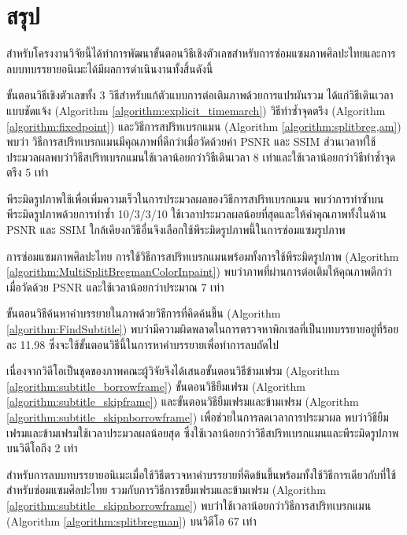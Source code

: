 \chapter{สรุป}

\hspace{1cm}สำหรับโครงงานวิจัยนี้ได้ทำการพัฒนาขั้นตอนวิธีเชิงตัวเลขสำหรับการซ่อมแซมภาพศิลปะไทยและการลบบทบรรยายอนิเมะได้มีผลการดำเนินงานทั้งสิ้นดังนี้

\hspace{1cm} ขั้นตอนวิธีเชิงตัวเลขทั้ง 3  วิธีสำหรับแก้ตัวแบบการต่อเติมภาพด้วยการแปรผันรวม ได้แก่วิธีเดินเวลาแบบชัดแจ้ง (Algorithm \ref{algorithm:explicit_timemarch}) วิธีทำซ้ำจุดตรึง (Algorithm \ref{algorithm:fixedpoint}) และวิธีการสปริทเบรกแมน (Algorithm \ref{algorithm:splitbreg,am}) พบว่า วิธีการสปริทเบรกแมนมีคุณภาพที่ดีกว่าเมื่อวัดด้วยค่า PSNR และ SSIM ส่วนเวลาท่ใช้ประมวลผลพบว่าวิธีสปริทเบรกแมนใช้เวลาน้อยกว่าวิธีเดินเวลา 8 เท่าและใช้เวลาน้อยกว่าวิธีทำซ้ำจุดตรึง 5 เท่า

\hspace{1cm} พีระมิดรูปภาพใช้เพื่อเพิ่มความเร็วในการประมวลผลของวิธีการสปริทเบรกแมน พบว่าการทำซ้ำบนพีระมิดรูปภาพด้วยการทำซ้ำ 10/3/3/10 ใช้เวลาประมวลผลน้อยที่สุดและให้ค่าคุณภาพทั้งในด้าน PSNR และ SSIM ใกล้เคียงกวิธีอื่นจึงเลือกใช้พีระมิดรูปภาพนี้ในการซ่อมแซมรูปภาพ

\hspace{1cm} การซ่อมแซมภาพศิลปะไทย การใช้วิธีการสปริทเบรกแมนพร้อมทั้งการใช้พีระมิดรูปภาพ (Algorithm \ref{algorithm:MultiSplitBregmanColorInpaint}) พบว่าภาพที่ผ่านการต่อเติมให้คุณภาพดีกว่าเมื่อวัดด้วย PSNR และใช้เวลาน้อยกว่าประมาณ 7 เท่า

\hspace{1cm} ขั้นตอนวิธีค้นหาคำบรรยายในภาพด้วยวิธีการที่คิดค้นขึ้น (Algorithm \ref{algorithm:FindSubtitle}) พบว่ามีความผิดพลาดในการตรวจหาพิกเซลที่เป็นบทบรรยายอยู่ที่ร้อยละ 11.98 ซึ่งจะใช้ขั้นตอนวิธีนี้ในการหาคำบรรยายเพื่อทำการลบถัดไป

\hspace{1cm} เนื่องจากวิดีโอเป็นชุดของภาพคณะผู้วิจัยจึงได้เสนอขั้นตอนวิธีข้ามเฟรม (Algorithm \ref{algorithm:subtitle_borrowframe})  ขั้นตอนวิธียืมเฟรม (Algorithm \ref{algorithm:subtitle_skipframe}) และขั้นตอนวิธียืมเฟรมและข้ามเฟรม (Algorithm \ref{algorithm:subtitle_skipnborrowframe}) เพื่อช่วยในการลดเวลาการประมวผล พบว่าวิธียืมเฟรมและข้ามเฟรมใช้เวลาประมวลผลน้อยสุด ซึ่งใช้เวลาน้อยกว่าวิธีสปริทเบรกแมนและพีระมิดรูปภาพบนวิดีโอถึง 2 เท่า

\hspace{1cm} สำหรับการลบบทบรรยายอนิเมะเมื่อใช้วิธีตรวจหาคำบรรยายที่คิดข้นขึ้นพร้อมทั้งใช้วิธีการเดียวกับที่ใช้สำหรับซ่อมแซมศิลปะไทย รวมกับการวิธีการขยืมเฟรมและข้ามเฟรม (Algorithm \ref{algorithm:subtitle_skipnborrowframe}) พบว่าใช้เวลาน้อยกว่าวิธีการสปริทเบรกแมน (Algorithm \ref{algorithm:splitbregman}) บนวิดีโอ 67 เท่า

\clearpage